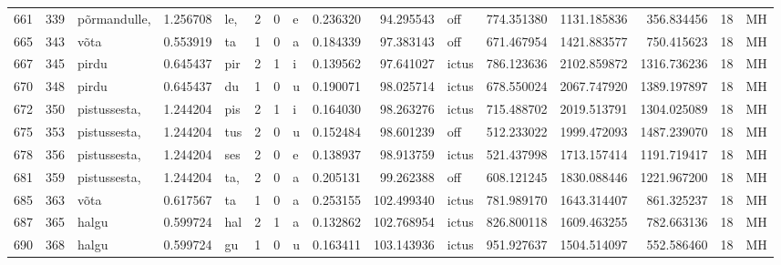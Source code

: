\begin{tabular}{lrlrllllrrlrrrll}
661  &         339 &     põrmandulle, &  1.256708 &     le, &        2 &      0 &       e &      0.236320 &     94.295543 &    off &   774.351380 &  1131.185836 &   356.834456 &     18 &        MH \\
665  &         343 &             võta &  0.553919 &      ta &        1 &      0 &       a &      0.184339 &     97.383143 &    off &   671.467954 &  1421.883577 &   750.415623 &     18 &        MH \\
667  &         345 &            pirdu &  0.645437 &     pir &        2 &      1 &       i &      0.139562 &     97.641027 &  ictus &   786.123636 &  2102.859872 &  1316.736236 &     18 &        MH \\
670  &         348 &            pirdu &  0.645437 &      du &        1 &      0 &       u &      0.190071 &     98.025714 &  ictus &   678.550024 &  2067.747920 &  1389.197897 &     18 &        MH \\
672  &         350 &     pistussesta, &  1.244204 &     pis &        2 &      1 &       i &      0.164030 &     98.263276 &  ictus &   715.488702 &  2019.513791 &  1304.025089 &     18 &        MH \\
675  &         353 &     pistussesta, &  1.244204 &     tus &        2 &      0 &       u &      0.152484 &     98.601239 &    off &   512.233022 &  1999.472093 &  1487.239070 &     18 &        MH \\
678  &         356 &     pistussesta, &  1.244204 &     ses &        2 &      0 &       e &      0.138937 &     98.913759 &  ictus &   521.437998 &  1713.157414 &  1191.719417 &     18 &        MH \\
681  &         359 &     pistussesta, &  1.244204 &     ta, &        2 &      0 &       a &      0.205131 &     99.262388 &    off &   608.121245 &  1830.088446 &  1221.967200 &     18 &        MH \\
685  &         363 &             võta &  0.617567 &      ta &        1 &      0 &       a &      0.253155 &    102.499340 &  ictus &   781.989170 &  1643.314407 &   861.325237 &     18 &        MH \\
687  &         365 &            halgu &  0.599724 &     hal &        2 &      1 &       a &      0.132862 &    102.768954 &  ictus &   826.800118 &  1609.463255 &   782.663136 &     18 &        MH \\
690  &         368 &            halgu &  0.599724 &      gu &        1 &      0 &       u &      0.163411 &    103.143936 &  ictus &   951.927637 &  1504.514097 &   552.586460 &     18 &        MH \\

\end{tabular}
